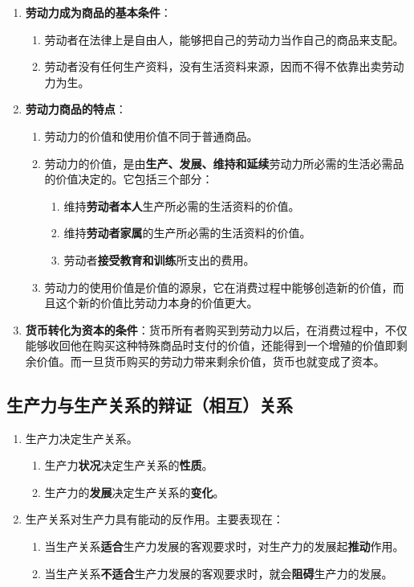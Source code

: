 \documentclass[12pt, a4paper, oneside]{ctexbook}
\begin{document}
\begin{enumerate}
\item \textbf{劳动力成为商品的基本条件}：
\begin{enumerate}
\item 劳动者在法律上是自由人，能够把自己的劳动力当作自己的商品来支配。
\item 劳动者没有任何生产资料，没有生活资料来源，因而不得不依靠出卖劳动力为生。
\end{enumerate}
\item \textbf{劳动力商品的特点}：
\begin{enumerate}
\item 劳动力的价值和使用价值不同于普通商品。
\item 劳动力的价值，是由\textbf{生产、发展、维持和延续}劳动力所必需的生活必需品的价值决定的。它包括三个部分：
\begin{enumerate}
\item 维持\textbf{劳动者本人}生产所必需的生活资料的价值。
\item 维持\textbf{劳动者家属}的生产所必需的生活资料的价值。
\item 劳动者\textbf{接受教育和训练}所支出的费用。
\end{enumerate}
\item 劳动力的使用价值是价值的源泉，它在消费过程中能够创造新的价值，而且这个新的价值比劳动力本身的价值更大。
\end{enumerate}
\item \textbf{货币转化为资本的条件}：货币所有者购买到劳动力以后，在消费过程中，不仅能够收回他在购买这种特殊商品时支付的价值，还能得到一个增殖的价值即剩余价值。而一旦货币购买的劳动力带来剩余价值，货币也就变成了资本。
\end{enumerate}

\subsection{生产力与生产关系的辩证（相互）关系}

\begin{enumerate}
\item 生产力决定生产关系。
\begin{enumerate}
\item 生产力\textbf{状况}决定生产关系的\textbf{性质}。
\item 生产力的\textbf{发展}决定生产关系的\textbf{变化}。
\end{enumerate}
\item 生产关系对生产力具有能动的反作用。主要表现在：
\begin{enumerate}
\item 当生产关系\textbf{适合}生产力发展的客观要求时，对生产力的发展起\textbf{推动}作用。
\item 当生产关系\textbf{不适合}生产力发展的客观要求时，就会\textbf{阻碍}生产力的发展。
\end{enumerate}
\end{enumerate}
\end{document}
